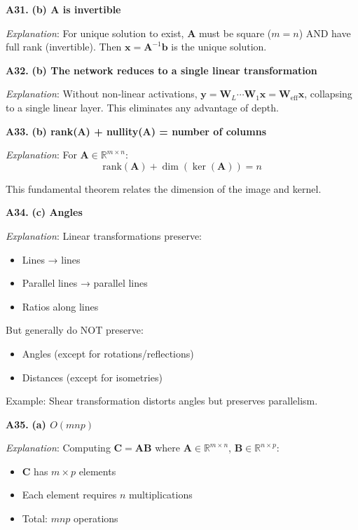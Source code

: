 \documentclass[12pt,a4paper]{article}
\theoremstyle{definition}
\begin{document}
\textbf{A31.} \textbf{(b) $\mathbf{A}$ is invertible}

\textit{Explanation}: For unique solution to exist, $\mathbf{A}$ must be square ($m = n$) AND have full rank (invertible). Then $\mathbf{x} = \mathbf{A}^{-1}\mathbf{b}$ is the unique solution.

\textbf{A32.} \textbf{(b) The network reduces to a single linear transformation}

\textit{Explanation}: Without non-linear activations, $\mathbf{y} = \mathbf{W}_L \cdots \mathbf{W}_1\mathbf{x} = \mathbf{W}_{\text{eff}}\mathbf{x}$, collapsing to a single linear layer. This eliminates any advantage of depth.

\textbf{A33.} \textbf{(b) rank($\mathbf{A}$) + nullity($\mathbf{A}$) = number of columns}

\textit{Explanation}: For $\mathbf{A} \in \mathbb{R}^{m \times n}$: 
\[
\text{rank}(\mathbf{A}) + \dim(\ker(\mathbf{A})) = n
\]

This fundamental theorem relates the dimension of the image and kernel.

\textbf{A34.} \textbf{(c) Angles}

\textit{Explanation}: Linear transformations preserve:
\begin{itemize}
\item Lines → lines
\item Parallel lines → parallel lines  
\item Ratios along lines
\end{itemize}

But generally do NOT preserve:
\begin{itemize}
\item Angles (except for rotations/reflections)
\item Distances (except for isometries)
\end{itemize}

Example: Shear transformation distorts angles but preserves parallelism.

\textbf{A35.} \textbf{(a) $O(mnp)$}

\textit{Explanation}: Computing $\mathbf{C} = \mathbf{AB}$ where $\mathbf{A} \in \mathbb{R}^{m \times n}$, $\mathbf{B} \in \mathbb{R}^{n \times p}$:
\begin{itemize}
\item $\mathbf{C}$ has $m \times p$ elements
\item Each element requires $n$ multiplications
\item Total: $mnp$ operations
\end{itemize}
\end{document}
